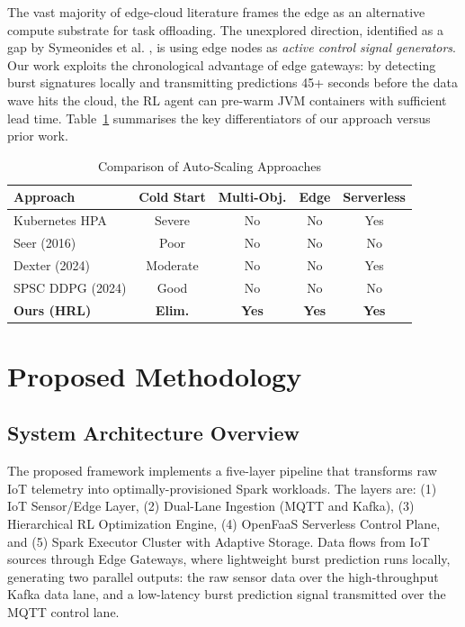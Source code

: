 \documentclass[10pt, conference, compsocconf]{IEEEtran}
\begin{document}
The vast majority of edge-cloud literature frames the edge as an alternative compute substrate for task offloading. The unexplored direction, identified as a gap by Symeonides et al. \cite{symeonides2023sparkedge}, is using edge nodes as \textit{active control signal generators}. Our work exploits the chronological advantage of edge gateways: by detecting burst signatures locally and transmitting predictions 45+ seconds before the data wave hits the cloud, the RL agent can pre-warm JVM containers with sufficient lead time. Table~\ref{tab:lit_comparison} summarises the key differentiators of our approach versus prior work.

\begin{table}[ht]
\centering
\caption{Comparison of Auto-Scaling Approaches}
\label{tab:lit_comparison}
\renewcommand{\arraystretch}{1.2}
\begin{tabular}{lcccc}
\toprule
\textbf{Approach} & \textbf{Cold Start} & \textbf{Multi-Obj.} & \textbf{Edge} & \textbf{Serverless} \\
\midrule
Kubernetes HPA       & Severe   & No  & No  & Yes \\
Seer (2016)          & Poor     & No  & No  & No  \\
Dexter (2024)        & Moderate & No  & No  & Yes \\
SPSC DDPG (2024)     & Good     & No  & No  & No  \\
\textbf{Ours (HRL)}  & \textbf{Elim.} & \textbf{Yes} & \textbf{Yes} & \textbf{Yes} \\
\bottomrule
\end{tabular}
\end{table}

\section{Proposed Methodology}

\subsection{System Architecture Overview}

The proposed framework implements a five-layer pipeline that transforms raw IoT telemetry into optimally-provisioned Spark workloads. The layers are: (1) IoT Sensor/Edge Layer, (2) Dual-Lane Ingestion (MQTT and Kafka), (3) Hierarchical RL Optimization Engine, (4) OpenFaaS Serverless Control Plane, and (5) Spark Executor Cluster with Adaptive Storage. Data flows from IoT sources through Edge Gateways, where lightweight burst prediction runs locally, generating two parallel outputs: the raw sensor data over the high-throughput Kafka data lane, and a low-latency burst prediction signal transmitted over the MQTT control lane.
\end{document}
